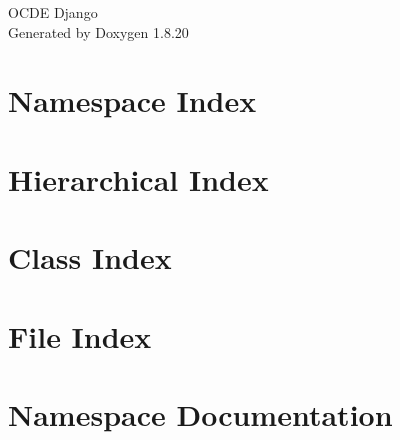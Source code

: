 \let\mypdfximage\pdfximage\def\pdfximage{\immediate\mypdfximage}\documentclass[twoside]{book}
\newcommand{\+}{\discretionary{\mbox{\scriptsize$\hookleftarrow$}}{}{}}
\newcommand{\clearemptydoublepage}{%
  \newpage{\pagestyle{empty}\cleardoublepage}%
}
\begin{document}
\hypersetup{pageanchor=false,
             bookmarksnumbered=true,
             pdfencoding=unicode
            }
\begin{titlepage}
\vspace*{7cm}
\begin{center}%
{\Large O\+C\+DE Django }\\
\vspace*{1cm}
{\large Generated by Doxygen 1.8.20}\\
\end{center}
\end{titlepage}
\clearemptydoublepage
{}
\tableofcontents
\clearemptydoublepage
{}
\hypersetup{pageanchor=true}

\chapter{Namespace Index}

\chapter{Hierarchical Index}

\chapter{Class Index}

\chapter{File Index}

\chapter{Namespace Documentation}
































\end{document}
